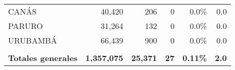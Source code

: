 \begin{tabular}{@{}lrrrrr@{}}
	\cellcolor[HTML]{9AFF99}CANÁS         & 40,420                                                         & 206                                                                  & 0                                                              & 0.0\%                                                                  & 0.0                                                                                                                                \\
	\cellcolor[HTML]{9AFF99}PARURO        & 31,264                                                         & 132                                                                  & 0                                                              & 0.0\%                                                                  & 0.0                                                                                                                                \\
	\cellcolor[HTML]{9AFF99}URUBAMBÁ      & 66,439                                                         & 900                                                                  & 0                                                              & 0.0\%                                                                  & 0.0                                                                                                                                \\
	& \multicolumn{1}{l}{}                                           & \multicolumn{1}{l}{}                                                 & \multicolumn{1}{l}{}                                           & \multicolumn{1}{l}{}                                                   & \multicolumn{1}{l}{}                                                                                                               \\
	\rowcolor[HTML]{ECF4FF} 
	\textbf{Totales generales}            & \textbf{1,357,075}                                             & \textbf{25,371}                                                      & \textbf{27}                                                    & \textbf{0.11\%}                                                        & \textbf{2.0}                                                                                                                      
\end{tabular}